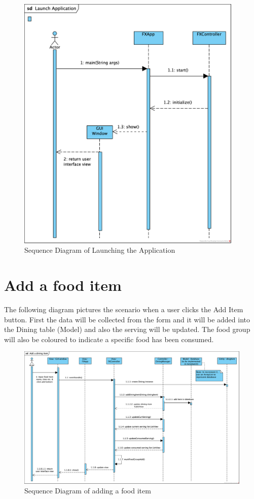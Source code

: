 \documentclass{scrreprt}
\begin{document}
\begin{figure}[!htbp]
\centering
\includegraphics[width=10.8cm]{pictures/sd-LaunchApp.png}
\caption{Sequence Diagram of Launching the Application}
\end{figure}

\FloatBarrier

\section{Add a food item}

The following diagram pictures the scenario when a user clicks the Add Item button. First the data will be collected from the form and it will be added into the Dining table (Model) and also the serving will be updated. The food group will also be coloured to indicate a specific food has been consumed.

\begin{figure}[!htbp]
\centering
\includegraphics[width=17.5cm]{pictures/sd-addItem.png}
\caption{Sequence Diagram of adding a food item}
\end{figure}
\end{document}
